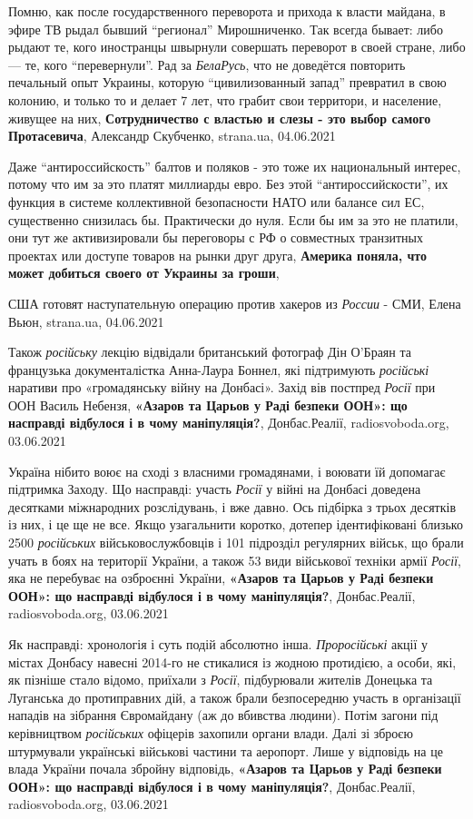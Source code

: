 Помню, как после государственного переворота и прихода к власти майдана, в
эфире ТВ рыдал бывший \enquote{регионал} Мирошниченко. Так всегда бывает: либо рыдают
те, кого иностранцы швырнули совершать переворот в своей стране, либо — те,
кого \enquote{перевернули}.  Рад за \emph{БелаРусь}, что не доведётся повторить печальный опыт
Украины, которую \enquote{цивилизованный запад} превратил в свою колонию, и только то и
делает 7 лет, что грабит свои территори, и население, живущее на них,
\textbf{Сотрудничество с властью и слезы - это выбор самого Протасевича},
Александр Скубченко, strana.ua, 04.06.2021

Даже \enquote{антироссийскость} балтов и поляков - это тоже их национальный интерес,
потому что им за это платят миллиарды евро.  Без этой \enquote{антироссийскости}, их
функция в системе коллективной безопасности НАТО или балансе сил ЕС,
существенно снизилась бы. Практически до нуля.  Если бы им за это не платили,
они тут же активизировали бы переговоры с РФ о совместных транзитных проектах
или доступе товаров на рынки друг друга,
\textbf{Америка поняла, что может добиться своего от Украины за гроши},

США готовят наступательную операцию против хакеров из \emph{России} - СМИ,
Елена Вьюн, strana.ua, 04.06.2021

Також \emph{російську} лекцію відвідали британський фотограф Дін О'Браян та французька
документалістка Анна-Лаура Боннел, які підтримують \emph{російські} наративи про
«громадянську війну на Донбасі».  Захід вів постпред \emph{Росії} при ООН Василь
Небензя,
\textbf{«Азаров та Царьов у Раді безпеки ООН»: що насправді відбулося і в чому маніпуляція?},
Донбас.Реалії, radiosvoboda.org, 03.06.2021

Україна нібито воює на сході з власними громадянами, і воювати їй допомагає
підтримка Заходу.  Що насправді: участь \emph{Росії} у війні на Донбасі доведена
десятками міжнародних розслідувань, і вже давно. Ось підбірка з трьох десятків
із них, і це ще не все. Якщо узагальнити коротко, дотепер ідентифіковані
близько 2500 \emph{російських} військовослужбовців і 101 підрозділ регулярних військ,
що брали учать в боях на території України, а також 53 види військової техніки
армії \emph{Росії}, яка не перебуває на озброєнні України,
\textbf{«Азаров та Царьов у Раді безпеки ООН»: що насправді відбулося і в чому маніпуляція?},
Донбас.Реалії, radiosvoboda.org, 03.06.2021

Як насправді: хронологія і суть подій абсолютно інша. \emph{Проросійські} акції у
містах Донбасу навесні 2014-го не стикалися із жодною протидією, а особи, які,
як пізніше стало відомо, приїхали з \emph{Росії}, підбурювали жителів Донецька та
Луганська до протиправних дій, а також брали безпосередню участь в організації
нападів на зібрання Євромайдану (аж до вбивства людини). Потім загони під
керівництвом \emph{російських} офіцерів захопили органи влади. Далі зі зброєю
штурмували українські військові частини та аеропорт. Лише у відповідь на це
влада України почала збройну відповідь,
\textbf{«Азаров та Царьов у Раді безпеки ООН»: що насправді відбулося і в чому маніпуляція?},
Донбас.Реалії, radiosvoboda.org, 03.06.2021

